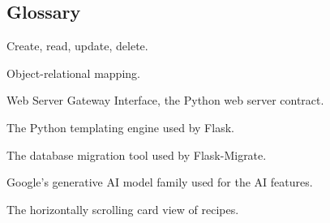 \documentclass[11pt,a4paper]{article}
\begin{document}
\subsection{Glossary}
\begin{description}[nosep,leftmargin=3.4cm]
  \item[CRUD] Create, read, update, delete.
  \item[ORM] Object-relational mapping.
  \item[WSGI] Web Server Gateway Interface, the Python web server contract.
  \item[Jinja2] The Python templating engine used by Flask.
  \item[Alembic] The database migration tool used by Flask-Migrate.
  \item[Gemini] Google's generative AI model family used for the AI features.
  \item[Filmstrip] The horizontally scrolling card view of recipes.
\end{description}
\end{document}
